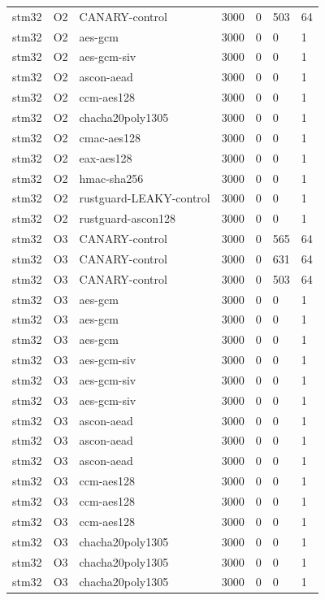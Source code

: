 \begin{table}[t]
\begin{tabular}{lllllll}
    stm32 & O2 & CANARY-control & 3000 & 0 & 503 & 64 \\
    stm32 & O2 & aes-gcm & 3000 & 0 & 0 & 1 \\
    stm32 & O2 & aes-gcm-siv & 3000 & 0 & 0 & 1 \\
    stm32 & O2 & ascon-aead & 3000 & 0 & 0 & 1 \\
    stm32 & O2 & ccm-aes128 & 3000 & 0 & 0 & 1 \\
    stm32 & O2 & chacha20poly1305 & 3000 & 0 & 0 & 1 \\
    stm32 & O2 & cmac-aes128 & 3000 & 0 & 0 & 1 \\
    stm32 & O2 & eax-aes128 & 3000 & 0 & 0 & 1 \\
    stm32 & O2 & hmac-sha256 & 3000 & 0 & 0 & 1 \\
    stm32 & O2 & rustguard-LEAKY-control & 3000 & 0 & 0 & 1 \\
    stm32 & O2 & rustguard-ascon128 & 3000 & 0 & 0 & 1 \\
    stm32 & O3 & CANARY-control & 3000 & 0 & 565 & 64 \\
    stm32 & O3 & CANARY-control & 3000 & 0 & 631 & 64 \\
    stm32 & O3 & CANARY-control & 3000 & 0 & 503 & 64 \\
    stm32 & O3 & aes-gcm & 3000 & 0 & 0 & 1 \\
    stm32 & O3 & aes-gcm & 3000 & 0 & 0 & 1 \\
    stm32 & O3 & aes-gcm & 3000 & 0 & 0 & 1 \\
    stm32 & O3 & aes-gcm-siv & 3000 & 0 & 0 & 1 \\
    stm32 & O3 & aes-gcm-siv & 3000 & 0 & 0 & 1 \\
    stm32 & O3 & aes-gcm-siv & 3000 & 0 & 0 & 1 \\
    stm32 & O3 & ascon-aead & 3000 & 0 & 0 & 1 \\
    stm32 & O3 & ascon-aead & 3000 & 0 & 0 & 1 \\
    stm32 & O3 & ascon-aead & 3000 & 0 & 0 & 1 \\
    stm32 & O3 & ccm-aes128 & 3000 & 0 & 0 & 1 \\
    stm32 & O3 & ccm-aes128 & 3000 & 0 & 0 & 1 \\
    stm32 & O3 & ccm-aes128 & 3000 & 0 & 0 & 1 \\
    stm32 & O3 & chacha20poly1305 & 3000 & 0 & 0 & 1 \\
    stm32 & O3 & chacha20poly1305 & 3000 & 0 & 0 & 1 \\
    stm32 & O3 & chacha20poly1305 & 3000 & 0 & 0 & 1 \\

\end{tabular}
\end{table}
